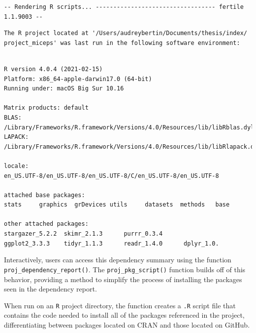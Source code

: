 \documentclass[12pt,twoside]{reedthesis}
\begin{document}
\small
\begin{verbatim}
-- Rendering R scripts... ---------------------------------- fertile 1.1.9003 --
\end{verbatim}
\begin{verbatim}
The R project located at '/Users/audreybertin/Documents/thesis/index/
project_miceps' was last run in the following software environment:
\end{verbatim}
\begin{verbatim}

R version 4.0.4 (2021-02-15)
Platform: x86_64-apple-darwin17.0 (64-bit)
Running under: macOS Big Sur 10.16

Matrix products: default
BLAS:   /Library/Frameworks/R.framework/Versions/4.0/Resources/lib/libRblas.dylib
LAPACK: /Library/Frameworks/R.framework/Versions/4.0/Resources/lib/libRlapack.dylib

locale:
en_US.UTF-8/en_US.UTF-8/en_US.UTF-8/C/en_US.UTF-8/en_US.UTF-8

attached base packages:
stats     graphics  grDevices utils     datasets  methods   base     

other attached packages:
stargazer_5.2.2  skimr_2.1.3      purrr_0.3.4     
ggplot2_3.3.3    tidyr_1.1.3      readr_1.4.0      dplyr_1.0.
\end{verbatim}
\normalsize

Interactively, users can access this dependency summary using the function \texttt{proj\_dependency\_report()}. The \texttt{proj\_pkg\_script()} function builds off of this behavior, providing a method to simplify the process of installing the packages seen in the dependency report.

When run on an \texttt{R} project directory, the function creates a \texttt{.R} script file that contains the code needed to install all of the packages referenced in the project, differentiating between packages located on CRAN and those located on GitHub.
\end{document}
